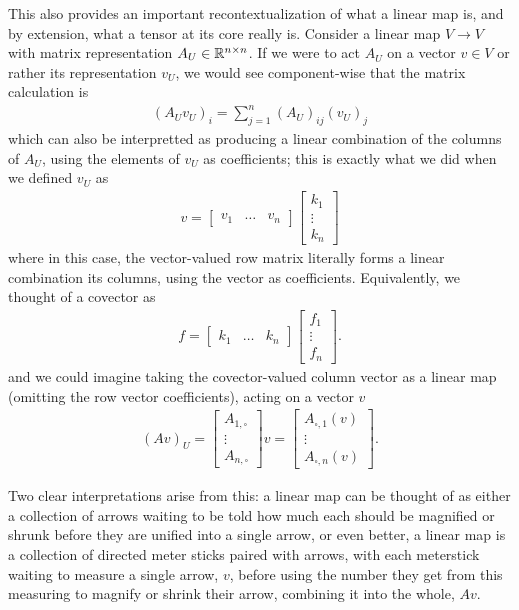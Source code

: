 \documentclass[11pt]{article}
\begin{document}
This also provides an important recontextualization of what a linear map is, and by extension, what a tensor at its core really is. Consider a linear map $V \to V$ with matrix representation $A_U \in \mathbb{R}^{n \times n}$. If we were to act $A_U$ on a vector $v\in V$ or rather its representation $v_U$, we would see component-wise that the matrix calculation is \begin{gather*}
(A_U v_U)_{i} = \sum_{j=1}^n (A_U)_{ij} (v_U)_j
\end{gather*}
which can also be interpretted as producing a linear combination of the columns of $A_U$, using the elements of $v_U$ as coefficients; this is exactly what we did when we defined $v_U$ as \begin{gather*}
v = \begin{bmatrix} v_1 & \dots & v_n \end{bmatrix} \begin{bmatrix} k_1 \\ \vdots \\ k_n \end{bmatrix}
\end{gather*}
where in this case, the vector-valued row matrix literally forms a linear combination its columns, using the vector as coefficients. Equivalently, we thought of a covector as \begin{gather*}
f = \begin{bmatrix} k_1 & \dots & k_n \end{bmatrix} \begin{bmatrix} f_1 \\ \vdots \\ f_n \end{bmatrix}.
\end{gather*}
and we could imagine taking the covector-valued column vector as a linear map (omitting the row vector coefficients), acting on a vector $v$ \begin{gather*}
(Av)_U = \begin{bmatrix} A_{1, \square} \\ \vdots \\ A_{n,\square} \end{bmatrix} v = \begin{bmatrix} A_{\square,1}(v) \\ \vdots \\ A_{\square,n}(v) \end{bmatrix}.
\end{gather*}

Two clear interpretations arise from this: a linear map can be thought of as either a collection of arrows waiting to be told how much each should be magnified or shrunk before they are unified into a single arrow, or even better, a linear map is a collection of directed meter sticks paired with arrows, with each meterstick waiting to measure a single arrow, $v$, before using the number they get from this measuring to magnify or shrink their arrow, combining it into the whole, $Av$.
\end{document}
